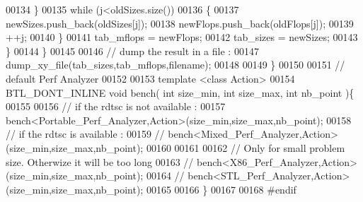 \begin{DoxyCode}
00134       \}
00135       \textcolor{keywordflow}{while} (j<oldSizes.size())
00136       \{
00137         newSizes.push\_back(oldSizes[j]);
00138         newFlops.push\_back(oldFlops[j]);
00139         ++j;
00140       \}
00141       tab\_mflops = newFlops;
00142       tab\_sizes = newSizes;
00143     \}
00144   \}
00145 
00146   \textcolor{comment}{// dump the result in a file  :}
00147   dump\_xy\_file(tab\_sizes,tab\_mflops,filename);
00148 
00149 \}
00150 
00151 \textcolor{comment}{// default Perf Analyzer}
00152 
00153 \textcolor{keyword}{template} <\textcolor{keyword}{class} Action>
00154 BTL\_DONT\_INLINE \textcolor{keywordtype}{void} bench( \textcolor{keywordtype}{int} size\_min, \textcolor{keywordtype}{int} size\_max, \textcolor{keywordtype}{int} nb\_point )\{
00155 
00156   \textcolor{comment}{// if the rdtsc is not available :}
00157   bench<Portable\_Perf\_Analyzer,Action>(size\_min,size\_max,nb\_point);
00158   \textcolor{comment}{// if the rdtsc is available :}
00159 \textcolor{comment}{//    bench<Mixed\_Perf\_Analyzer,Action>(size\_min,size\_max,nb\_point);}
00160 
00161 
00162   \textcolor{comment}{// Only for small problem size. Otherwize it will be too long}
00163 \textcolor{comment}{//   bench<X86\_Perf\_Analyzer,Action>(size\_min,size\_max,nb\_point);}
00164 \textcolor{comment}{//   bench<STL\_Perf\_Analyzer,Action>(size\_min,size\_max,nb\_point);}
00165 
00166 \}
00167 
00168 \textcolor{preprocessor}{#endif}
\end{DoxyCode}

